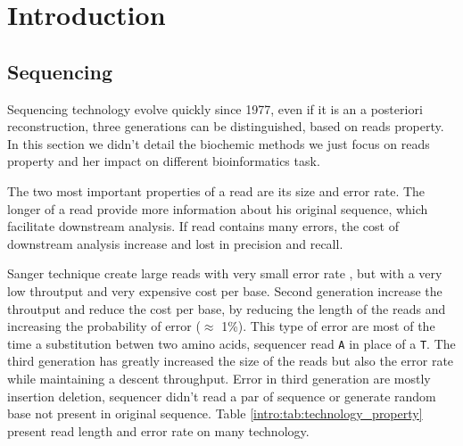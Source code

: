 \documentclass[./main.tex]{subfiles}
\begin{document}
\chapter{Introduction}
\section{Sequencing}

Sequencing technology evolve quickly since 1977, even if it is an a posteriori reconstruction, three generations can be distinguished, based on reads property. In this section we didn't detail the biochemic methods we just focus on reads property and her impact on different bioinformatics task.

The two most important properties of a read are its size and error rate. The longer of a read provide more information about his original sequence, which facilitate downstream analysis. If read contains many errors, the cost of downstream analysis increase and lost in precision and recall.

Sanger technique create large reads  with very small error rate , but with a very low throutput and very expensive cost per base.
Second generation increase the throutput and reduce the cost per base, by reducing the length of the reads and increasing the probability of error ($\approx$ 1\%). This type of error are most of the time a substitution betwen two amino acids, sequencer read \texttt{A} in place of a \texttt{T}.
The third generation has greatly increased the size of the reads but also the error rate while maintaining a descent throughput. Error in third generation are mostly insertion deletion, sequencer didn't read a par of sequence or generate random base not present in original sequence. Table \ref{intro:tab:technology_property} present read length and error rate on many technology.
\end{document}
